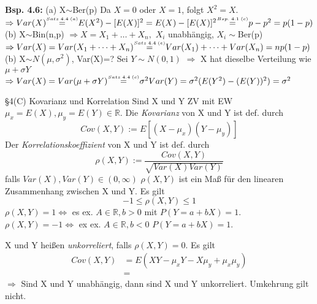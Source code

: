 \documentclass[a4paper,11pt]{article}
\newcommand\sfofoa{\overset{\mathclap{\scriptscriptstyle Satz \hspace{2pt} 4.4 \hspace{2pt} (a)}}{=}}
\newcommand\bspfoonc{\overset{\mathclap{\scriptscriptstyle Bsp. \hspace{2pt} 4.1 \hspace{2pt} (c)}}{=}}
\newcommand\sfofoe{\overset{\mathclap{\scriptscriptstyle Satz \hspace{2pt} 4.4 \hspace{2pt} (e)}}{=}}
\newcommand\sfofoc{\overset{\mathclap{\scriptscriptstyle Satz \hspace{2pt} 4.4 \hspace{2pt} (c)}}{=}}
\begin{document}
\vspace{6pt}
\noindent\textbf{Bsp. 4.6:} (a) X$\sim$Ber(p)
\newline Da $X=0$ oder $X=1$, folgt $X^2=X$. 
\newline $\Rightarrow Var(X) \hspace{12pt}\sfofoa\hspace{12pt} E(X^2)-[E(X)]^2=E(X)-[E(X)]^2 \hspace{12pt}\bspfoonc\hspace{12pt} p-p^2 = p(1-p)$
\vspace{4pt}
\noindent (b) X$\sim$Bin(n,p)
\newline $\Rightarrow X=X_1+\dots+X_n,$ $X_i$ unabhängig, $X_i\sim$Ber(p)
\newline $\Rightarrow Var(X)= Var(X_1+\dots+X_n) \hspace{12pt}\sfofoe\hspace{12pt} Var(X_1)+\dots+Var(X_n)=np(1-p)$
\vspace{4pt}
\noindent (b) X$\sim N(\mu,\sigma^2)$, Var(X)=?
\newline Sei $Y\sim N(0,1)$
\newline $\Rightarrow$ X hat dieselbe Verteilung wie $\mu+\sigma Y$
\newline $\Rightarrow Var(X)= Var(\mu + \sigma Y) \hspace{12pt}\sfofoc\hspace{12pt} \sigma^2Var(Y) = \sigma^2(E(Y^2)-(E(Y))^2)=\sigma^2$

§4(C) Kovarianz und Korrelation
\newline Sind X und Y ZV mit EW $\mu_x=E(X),\mu_y=E(Y)\in\mathbb{R}$.
\newline Die \textit{Kovarianz} von X und Y ist def. durch
\[Cov(X,Y):=E[(X-\mu_x)(Y-\mu_y)]\]
\newline Der \textit{Korrelationskoeffizient} von X und Y ist def. durch 
\[\rho(X,Y):=\frac{Cov(X,Y)}{\sqrt{Var(X)Var(Y)}}\]
falls $Var(X),Var(Y)\in(0,\infty)$
\newline $\rho(X,Y)$ ist ein Maß für den linearen Zusammenhang zwischen X und Y.
\newline Es gilt 
\[-1\leq\rho(X,Y)\leq1\]
$\rho(X,Y)=1 \Leftrightarrow$ es ex. $A\in\mathbb{R},b>0$ mit $P(Y=a+bX)=1$.
$\rho(X,Y)=-1 \Leftrightarrow$ ex ex. $A\in\mathbb{R},b<0$ $P(Y=a+bX)=1$.

\vspace{6pt}
\noindent X und Y heißen \textit{unkorreliert}, falls $\rho(X,Y)=0$.
\newline Es gilt 
\begin{align*}
Cov(X,Y) &= E(XY-\mu_xY-X\mu_y+\mu_x\mu_y)\\
&= 
\end{align*}
$\Rightarrow$ Sind X und Y unabhängig, dann sind X und Y unkorreliert. Umkehrung gilt nicht.
\end{document}
